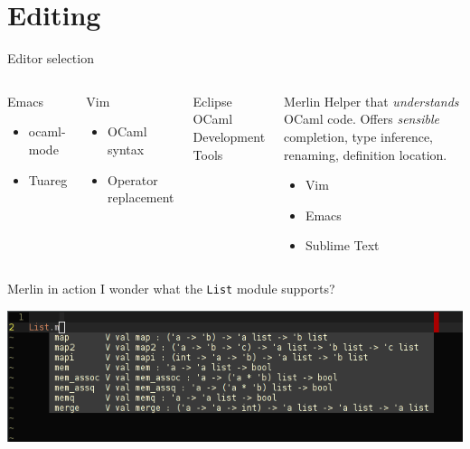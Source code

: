 \documentclass{beamer}
\begin{document}
\section{Editing}

\begin{frame}{Editor selection}
  \begin{columns}[t]
    \begin{block}{Emacs}
      \begin{itemize}
        \item ocaml-mode
        \item Tuareg
      \end{itemize}
    \end{block}
    \begin{block}{Vim}
      \begin{itemize}
        \item OCaml syntax
        \item Operator replacement
      \end{itemize}
    \end{block}
    \begin{block}{Eclipse}
      OCaml Development Tools
    \end{block}
    \begin{block}{Merlin}
      Helper that \emph{understands} OCaml code. Offers \emph{sensible}
      completion, type inference, renaming, definition location.
      \begin{itemize}
        \item Vim
        \item Emacs
        \item Sublime Text
      \end{itemize}
    \end{block}
  \end{columns}
\end{frame}

\begin{frame}{Merlin in action}
  I wonder what the \texttt{List} module supports?

  \pause
  \includegraphics[width=\textwidth]{vim_complete}
\end{frame}
\end{document}
